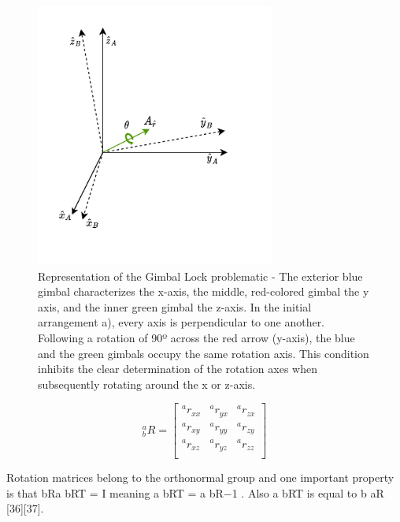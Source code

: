 \begin{figure}[!h]
    \centering
    \includegraphics[width=0.7\textwidth]{figures/rotation.pdf}
    \caption{Representation of the Gimbal Lock problematic \cite{zeitlhofler2019nominal} - The exterior blue gimbal characterizes the x-axis, the middle, red-colored gimbal the y axis, and the inner green gimbal the z-axis. In the initial arrangement a), every axis is perpendicular to one another. Following a rotation of 90º across the red arrow (y-axis), the blue and the green gimbals occupy the same rotation axis. This condition inhibits the clear determination of the rotation axes when subsequently rotating around the x or z-axis. }
    \label{fig:gimbal_lock}
\end{figure}


\begin{equation}
    \textrm{$_{b}^{a}R$}
    =
    \begin{bmatrix}
        \textrm{$^{a}r_{xx}$} & \textrm{$^{a}r_{yx}$} & \textrm{$^{a}r_{zx}$} \\
        \textrm{$^{a}r_{xy}$} & \textrm{$^{a}r_{yy}$} & \textrm{$^{a}r_{zy}$} \\
        \textrm{$^{a}r_{xz}$} & \textrm{$^{a}r_{yz}$} & \textrm{$^{a}r_{zz}$} \\
    \end{bmatrix}
    \label{eq:axes_frames}
\end{equation}

Rotation matrices belong to the orthonormal group and one important property is that bRa bRT = I meaning a bRT = a bR−1 . Also a bRT is equal to b aR [36][37].

